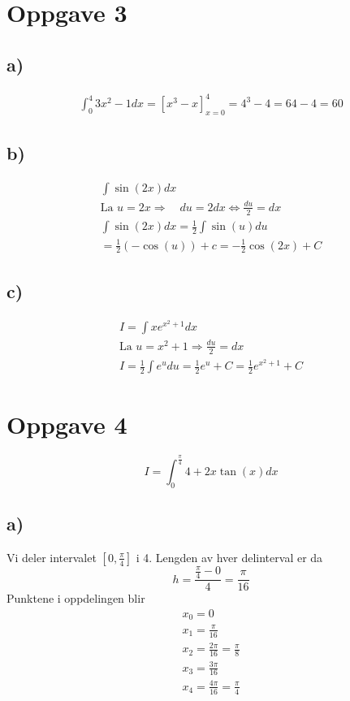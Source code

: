 \documentclass[12pt]{article}
\begin{document}
\break
\section*{Oppgave 3}
\subsection*{a)}
\begin{gather*}
  \displaystyle\int_{0}^{4}3x^2-1 dx = [x^3-x]_{x=0}^4 = 4^3 - 4 = 64-4 = 60
\end{gather*}

\subsection*{b)}
\begin{gather*}
  \displaystyle\int \sin(2x) dx \\ 
  \text{La } u = 2x \Rightarrow \quad du = 2dx \Leftrightarrow \frac{du}{2} = dx \\ 
  \displaystyle\int \sin(2x) dx = \frac{1}{2} \displaystyle\int \sin(u) du \\
  = \frac{1}{2} (-\cos(u)) + c = \boxed{-\frac{1}{2} \cos(2x) + C}
\end{gather*}

\subsection*{c)}
\begin{gather*}
  I = \displaystyle\int xe^{x^2 + 1} dx \\ 
  \text{La } u = x^2 + 1 \Rightarrow \frac{du}{2} = dx \\ 
  I = \frac{1}{2}\displaystyle\int e^u du
  = \frac{1}{2} e^u + C = \boxed{\frac{1}{2} e^{x^2+1} + C}
\end{gather*}

\break
\section*{Oppgave 4}
\[I = \displaystyle\int_{0}^{\frac{\pi}{4}} 4 + 2x \tan (x) dx\]
\subsection*{a)}
Vi deler intervalet \([0, \frac{\pi}{4}]\) i 4. 
Lengden av hver delinterval er da 
\[ 
  h = \frac{\frac{\pi}{4} - 0}{4} = \frac{\pi}{16} 
\]
Punktene i oppdelingen blir 
\begin{gather*} 
  x_0 = 0 \\
  x_1 = \frac{\pi}{16} \\
  x_2 = \frac{2\pi}{16} = \frac{\pi}{8} \\
  x_3 = \frac{3\pi}{16} \\ 
  x_4 = \frac{4\pi}{16} = \frac{\pi}{4}
\end{gather*}
\end{document}

